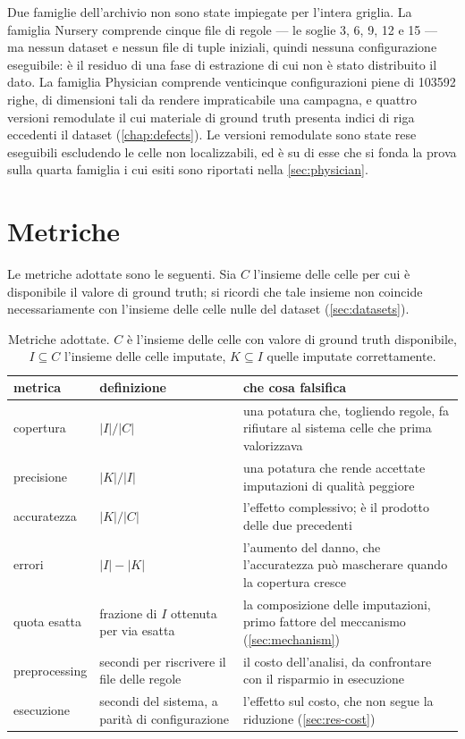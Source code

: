 Due famiglie dell'archivio non sono state impiegate per l'intera griglia. La famiglia Nursery
comprende cinque file di regole --- le soglie \num{3}, \num{6}, \num{9}, \num{12} e \num{15}
--- ma nessun dataset e nessun file di tuple iniziali, quindi nessuna configurazione eseguibile:
è il residuo di una fase di estrazione di cui non è stato distribuito il dato. La famiglia
Physician comprende venticinque configurazioni piene di \num{103592} righe, di dimensioni tali da
rendere impraticabile una campagna, e quattro versioni remodulate il cui materiale di ground truth
presenta indici di riga eccedenti il dataset (\autoref{chap:defects}). Le versioni remodulate sono
state rese eseguibili escludendo le celle non localizzabili, ed è su di esse che si fonda la prova
sulla quarta famiglia i cui esiti sono riportati nella \autoref{sec:physician}.

\section{Metriche}\label{sec:metrics}

Le metriche adottate sono le seguenti. Sia $C$ l'insieme delle celle per cui è disponibile il
valore di ground truth; si ricordi che tale insieme non coincide necessariamente con l'insieme
delle celle nulle del dataset (\autoref{sec:datasets}).

\begin{table}[htbp]
\centering
\caption{Metriche adottate. $C$ è l'insieme delle celle con valore di ground truth disponibile,
$I \subseteq C$ l'insieme delle celle imputate, $K \subseteq I$ quelle imputate correttamente.}
\label{tab:metrics}
\footnotesize
\begin{tabular}{@{}llp{4.4cm}@{}}
\toprule
metrica & definizione & che cosa falsifica \\
\midrule
copertura & $|I| / |C|$ & una potatura che, togliendo regole, fa rifiutare al sistema celle che
prima valorizzava \\
precisione & $|K| / |I|$ & una potatura che rende accettate imputazioni di qualità peggiore \\
accuratezza & $|K| / |C|$ & l'effetto complessivo; è il prodotto delle due precedenti \\
errori & $|I| - |K|$ & l'aumento del danno, che l'accuratezza può mascherare quando la copertura
cresce \\
quota esatta & frazione di $I$ ottenuta per via esatta & la composizione delle imputazioni, primo
fattore del meccanismo (\autoref{sec:mechanism}) \\
preprocessing & secondi per riscrivere il file delle regole & il costo dell'analisi, da
confrontare con il risparmio in esecuzione \\
esecuzione & secondi del sistema, a parità di configurazione & l'effetto sul costo, che
non segue la riduzione (\autoref{sec:res-cost}) \\
\bottomrule
\end{tabular}
\end{table}

